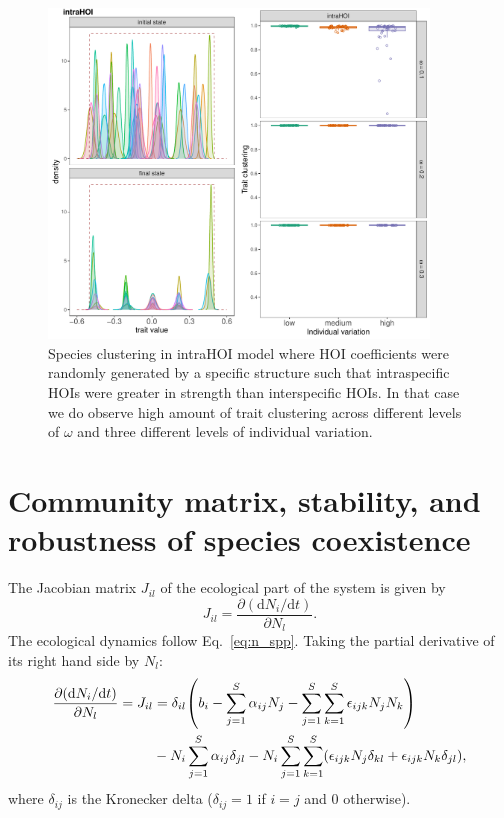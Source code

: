 \documentclass[10pt]{article}
\newcommand{\ud}{\text{d}}
\let\originalleft\left
\let\originalright\right
\renewcommand{\left}{\mathopen{}\mathclose\bgroup\originalleft}
\renewcommand{\right}{\aftergroup\egroup\originalright}
\begin{document}
\begin{figure}[!ht]
  \centering
  \includegraphics[width=0.9\textwidth]{intraHOI-clustering.pdf}
  \caption{Species clustering in intraHOI model where HOI coefficients were randomly generated by a specific structure such that intraspecific HOIs were greater in strength than interspecific HOIs. In that case we do observe high amount of trait clustering across different levels of $\omega$ and three different levels of individual variation.}
  \label{fig:intrahoi-clust}
\end{figure}


\section{Community matrix, stability, and robustness of species coexistence}

The Jacobian matrix $J_{il}$ of the ecological part of the system is given by
\begin{equation}
  \label{jacobian}
  J_{il} = \frac{\partial (\ud N_{i} / \ud t)} {\partial N_{l}}.
\end{equation}
The ecological dynamics follow Eq.~\ref{eq:n_spp}. Taking the partial derivative of its right hand side by $N_l$:
\begin{equation}
   \label{jacobian_explicit}
   \begin{split}
   \frac{\partial (\ud N_{i} / \ud t)} {\partial N_{l}} = J_{il}
   &= \delta_{il} \left( b_{i} - \sum_{j=1}^{S} \alpha_{ij}N_{j}- \sum_{j=1}^{S} \sum_{k=1}^{S}\epsilon_{ijk}N_{j}N_{k} \right)
   \\ &- N_{i} \sum_{j=1}^S \alpha_{ij} \delta_{jl}
   - N_{i} \sum_{j=1}^S \sum_{k=1}^{S} \left( \epsilon_{ijk} N_j \delta_{kl} + \epsilon_{ijk} N_k \delta_{jl} \right) ,
   \end{split}
\end{equation}
where $\delta_{ij}$ is the Kronecker delta ($\delta_{ij} = 1$ if $i=j$ and $0$ otherwise).
\end{document}
